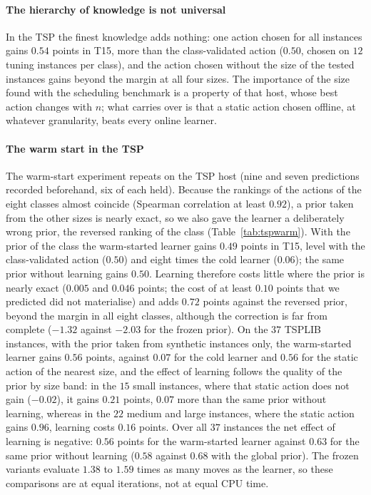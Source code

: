 \paragraph{The hierarchy of knowledge is not universal} In the TSP the finest knowledge adds nothing: one action chosen for all instances gains $0.54$ points in T15, more than the class-validated action ($0.50$, chosen on $12$ tuning instances per class), and the action chosen without the size of the tested instances gains beyond the margin at all four sizes. The importance of the size found with the scheduling benchmark is a property of that host, whose best action changes with $n$; what carries over is that a static action chosen offline, at whatever granularity, beats every online learner.





\paragraph{The warm start in the TSP} The warm-start experiment repeats on the TSP host (nine and seven predictions recorded beforehand, six of each held). Because the rankings of the actions of the eight classes almost coincide (Spearman correlation at least $0.92$), a prior taken from the other sizes is nearly exact, so we also gave the learner a deliberately wrong prior, the reversed ranking of the class (Table~\ref{tab:tspwarm}). With the prior of the class the warm-started learner gains $0.49$ points in T15, level with the class-validated action ($0.50$) and eight times the cold learner ($0.06$); the same prior without learning gains $0.50$. Learning therefore costs little where the prior is nearly exact ($0.005$ and $0.046$ points; the cost of at least $0.10$ points that we predicted did not materialise) and adds $0.72$ points against the reversed prior, beyond the margin in all eight classes, although the correction is far from complete ($-1.32$ against $-2.03$ for the frozen prior). On the $37$ TSPLIB instances, with the prior taken from synthetic instances only, the warm-started learner gains $0.56$ points, against $0.07$ for the cold learner and $0.56$ for the static action of the nearest size, and the effect of learning follows the quality of the prior by size band: in the $15$ small instances, where that static action does not gain ($-0.02$), it gains $0.21$ points, $0.07$ more than the same prior without learning, whereas in the $22$ medium and large instances, where the static action gains $0.96$, learning costs $0.16$ points. Over all $37$ instances the net effect of learning is negative: $0.56$ points for the warm-started learner against $0.63$ for the same prior without learning ($0.58$ against $0.68$ with the global prior). The frozen variants evaluate $1.38$ to $1.59$ times as many moves as the learner, so these comparisons are at equal iterations, not at equal CPU time.

